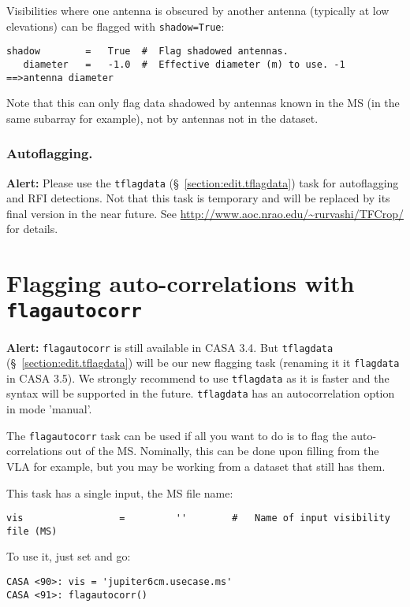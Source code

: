 Visibilities where one antenna is obscured by another antenna
(typically at low elevations) can be flagged with {\tt shadow=True}:
\small
\begin{verbatim}
shadow        =   True  #  Flag shadowed antennas.
   diameter   =   -1.0  #  Effective diameter (m) to use. -1 ==>antenna diameter
\end{verbatim}
\normalsize
Note that this can only flag data shadowed by antennas known in the MS
(in the same subarray for example), not by antennas not in the dataset.

\subsubsection{Autoflagging.}  

{\bf Alert:} Please use the {\tt tflagdata}
(\S~\ref{section:edit.tflagdata}) task for autoflagging and RFI
detections. Not that this task is temporary and will be replaced by
its final version in the near future. See
\url{http://www.aoc.nrao.edu/~rurvashi/TFCrop/} for details.



\section{Flagging auto-correlations with {\tt flagautocorr}}
\label{section:edit.flagautocorr}

{\bf Alert:} {\tt flagautocorr} is still available in CASA 3.4. But
{\tt tflagdata} (\S~\ref{section:edit.tflagdata}) will be our new
flagging task (renaming it it {\tt flagdata} in CASA 3.5). We strongly
recommend to use {\tt tflagdata} as it is faster and the syntax will
be supported in the future. {\tt tflagdata} has an autocorrelation
option in mode 'manual'.

The {\tt flagautocorr} task can be used if all you want to do
is to flag the auto-correlations out of the MS.  Nominally,
this can be done upon filling from the VLA for example, but
you may be working from a dataset that still has them.

This task has a single input, the MS file name:
\small
\begin{verbatim}
vis                 =         ''        #   Name of input visibility file (MS)
\end{verbatim}
\normalsize
To use it, just set and go:
\small
\begin{verbatim}
CASA <90>: vis = 'jupiter6cm.usecase.ms'                                         
CASA <91>: flagautocorr()
\end{verbatim}
\normalsize

